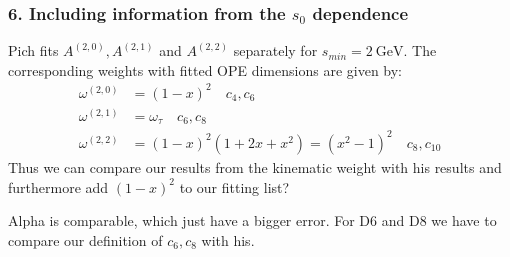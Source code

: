\documentclass[../../index.tex]{subfiles}
\begin{document}
\subsubsection{6. Including information from the $s_0$ dependence}
Pich fits $A^{(2,0)}, A^{(2,1)}$ and $A^{(2,2)}$ separately for $s_{min}=\SI{2}{\giga\eV}$.
The corresponding weights with fitted OPE dimensions are given by:
\begin{align}
  \omega^{(2,0)} &= (1-x)^2 \quad c_4, c_6 \\
  \omega^{(2,1)} &= \omega_{\tau} \quad c_6, c_8 \\
  \omega^{(2,2)} &= (1-x)^2(1+2x+x^2) = (x^2-1)^2 \quad c_8, c_{10}
\end{align}
Thus we can compare our results from the kinematic weight with his results and
furthermore add $(1-x)^2$ to our fitting list?

Alpha is comparable, which just have a bigger error. For D6 and D8 we have to
compare our definition of $c_6, c_8$ with his.
\end{document}
